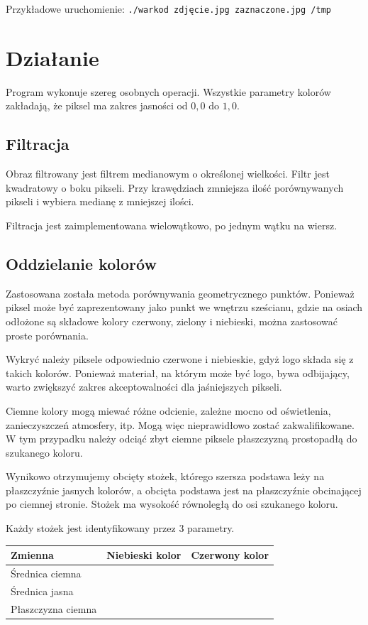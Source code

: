 \documentclass[a4paper,12pt]{article}
\begin{document}
			Przykładowe uruchomienie:
			\texttt{./warkod zdjęcie.jpg zaznaczone.jpg /tmp}
			
	\section{Działanie}
		Program wykonuje szereg osobnych operacji.
		Wszystkie parametry kolorów zakładają, że piksel ma zakres jasności od $0,0$ do $1,0$.
		\subsection{Filtracja}
			Obraz filtrowany jest filtrem medianowym o określonej wielkości.
			Filtr jest kwadratowy o boku \medianfilterside{} pikseli. 
			Przy krawędziach zmniejsza ilość porównywanych pikseli i wybiera medianę z mniejszej ilości.
			
			Filtracja jest zaimplementowana wielowątkowo, po jednym wątku na wiersz.
			
		\subsection{Oddzielanie kolorów}
			Zastosowana została metoda porównywania geometrycznego punktów. 
			Ponieważ piksel może być zaprezentowany jako punkt we wnętrzu sześcianu, gdzie na osiach odłożone są składowe kolory czerwony, zielony i niebieski,
			można zastosować proste porównania.
			
			Wykryć należy piksele odpowiednio czerwone i niebieskie, gdyż logo składa się z takich kolorów.
			Ponieważ materiał, na którym może być logo, bywa odbijający, warto zwiększyć zakres akceptowalności dla jaśniejszych pikseli.
			
			Ciemne kolory mogą miewać różne odcienie, zależne mocno od oświetlenia, zanieczyszczeń atmosfery, itp. Mogą więc nieprawidłowo zostać zakwalifikowane.
			W tym przypadku należy odciąć zbyt ciemne piksele płaszczyzną prostopadłą do szukanego koloru.
			
			Wynikowo otrzymujemy obcięty stożek, którego szersza podstawa leży na płaszczyźnie jasnych kolorów, a obcięta podstawa jest na płaszczyźnie obcinającej po ciemnej stronie. Stożek ma wysokość równoległą do osi szukanego koloru.
			
			Każdy stożek jest identyfikowany przez 3 parametry.
			
			\begin{center}
				\begin{tabular}{ l | c  c }
					Zmienna & Niebieski kolor & Czerwony kolor \\
					\hline
					Średnica ciemna 		& \darkblueradius{} 	& \darkredradius{} \\
					Średnica jasna			& \lightblueradius{}	& \lightredradius{} \\
					Płaszczyzna ciemna		& \darkbluethreshold{}	& \darkredthreshold{} \\
				\end{tabular}
			\end{center}
			
\end{document}
